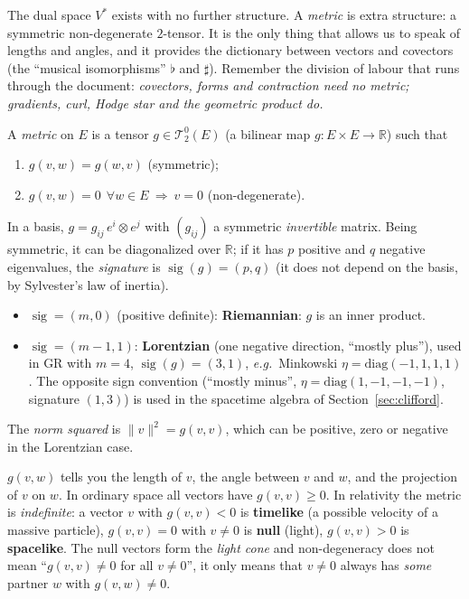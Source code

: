 \documentclass[11pt,a4paper]{article}
\numberwithin{equation}{section}
\theoremstyle{definition}
\theoremstyle{plain}
\newcommand{\R}{\mathbb{R}}
\newcommand{\sig}{\operatorname{sig}}
\newcommand{\TT}[2]{\mathcal{T}^{#1}_{#2}}          %
\newcommand{\eg}{\emph{e.g.}\ }
\begin{document}
The dual space $V^*$ exists with no further structure. A \emph{metric} is extra structure: a symmetric non-degenerate
$2$-tensor. It is the only thing that allows us to speak of lengths and angles, and it provides the dictionary
between vectors and covectors (the ``musical isomorphisms'' $\flat$ and $\sharp$). Remember the division of labour
that runs through the document: \emph{covectors, forms and contraction need no metric; gradients, curl, Hodge star and the geometric
product do.}
\begin{formal}[{metric}]
A \emph{metric} on $E$ is a tensor $g\in\TT{0}{2}(E)$ (a bilinear map $g:E\times E\to\R$) such that
\begin{enumerate}[label=(\roman*),nosep]
\item $g(v,w)=g(w,v)$ (symmetric);
\item $g(v,w)=0\ \ \forall w\in E\ \Rightarrow\ v=0$ (non-degenerate).
\end{enumerate}
In a basis, $g=g_{ij}\,e^{i}\otimes e^{j}$ with $(g_{ij})$ a symmetric \emph{invertible} matrix. Being symmetric, it can be diagonalized over $\R$; if it has $p$ positive and $q$ negative eigenvalues, the \emph{signature} is $\sig(g)=(p,q)$ (it does not depend on the basis, by Sylvester's law of inertia). 
\begin{itemize}[nosep]
\item $\sig=(m,0)$ (positive definite): \textbf{Riemannian}: $g$ is an inner product.
\item $\sig=(m-1,1)$: \textbf{Lorentzian} (one negative direction, ``mostly plus''), used in GR with $m=4$, $\sig(g)=(3,1)$, \eg Minkowski $\eta=\mathrm{diag}(-1,1,1,1)$. The opposite sign convention (``mostly minus'', $\eta=\mathrm{diag}(1,-1,-1,-1)$, signature $(1,3)$) is used in the spacetime algebra of Section~\ref{sec:clifford}.
\end{itemize}
The \emph{norm squared} is $\|v\|^2=g(v,v)$, which can be positive, zero or negative in the Lorentzian case.
\end{formal}

\begin{intuition}
$g(v,w)$ tells you the length of $v$, the angle between $v$ and $w$, and the projection of $v$ on $w$. In ordinary space all vectors have $g(v,v)\geq0$. In relativity the metric is \emph{indefinite}: a vector $v$ with $g(v,v)<0$ is \textbf{timelike} (a possible velocity of a massive particle), $g(v,v)=0$ with $v\ne0$ is \textbf{null} (light), $g(v,v)>0$ is \textbf{spacelike}. The null vectors form the \emph{light cone} and non-degeneracy does not mean ``$g(v,v)\neq0$ for all $v\neq0$'', it only means that $v\neq0$ always has \emph{some} partner $w$ with $g(v,w)\neq0$.
\end{intuition}
\end{document}
